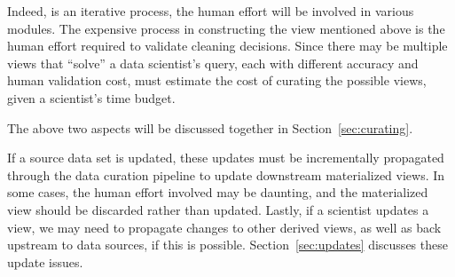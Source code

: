 

Indeed, \dcv is an iterative process, the human effort will be involved in various modules. The expensive process in constructing the view mentioned above is the human effort required to validate cleaning decisions. Since there may be multiple views that ``solve'' a data scientist's query, each with different accuracy and human validation cost, \dcv must estimate the cost of curating the possible views,
given a scientist's time budget. 

The above two aspects will be discussed together in Section~\ref{sec:curating}.



\stitle{[Updates.]}  
If a source data set is updated, these updates must be incrementally propagated through the data curation pipeline to update downstream materialized views. In some cases, the human effort involved may be daunting, and the materialized view should be discarded rather than updated. Lastly, if a scientist updates a view, we may need to propagate changes to other derived views, as well as back upstream to data sources, if this is possible. Section~\ref{sec:updates} discusses these update issues.



